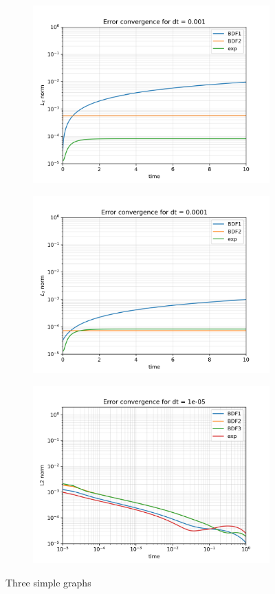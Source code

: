 \documentclass[12pt]{article}
\begin{document}
\begin{figure}
\begin{subfigure}[b]{0.4\textwidth}
		\caption{}
		\label{fig:l2normdt0.01}
	\end{subfigure}
	\begin{subfigure}[b]{0.4\textwidth}
		\centering
		\includegraphics[width=0.7\linewidth]{res/no_homogeneo/L2norm_dt_0.001}
		\caption{}
		\label{fig:l2normdt0.001}
	\end{subfigure}
	\begin{subfigure}[b]{0.4\textwidth}
		\centering
		\includegraphics[width=0.7\linewidth]{res/no_homogeneo/L2norm_dt_0.0001}
		\caption{}
		\label{fig:l2normdt0.0001}
	\end{subfigure}
	\begin{subfigure}[b]{0.4\textwidth}
		\centering
		\includegraphics[width=0.7\linewidth]{res/no_homogeneo/L2norm_dt_1e-05.png}
		\caption{}
		\label{fig:l2normdt0.0001}
	\end{subfigure}
	\caption{Three simple graphs}
	\label{fig:three graphs}
\end{figure}
\end{document}
